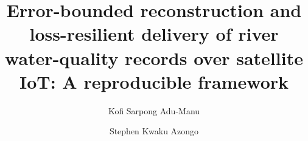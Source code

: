\documentclass[preprint,12pt,authoryear]{elsarticle}
\begin{document}
\begin{frontmatter}

\title{Error-bounded reconstruction and loss-resilient delivery of river water-quality records over satellite IoT: A reproducible framework}

\author[ug]{Kofi Sarpong Adu-Manu}
\author[ug]{Stephen Kwaku Azongo}



\end{frontmatter}











\end{document}

